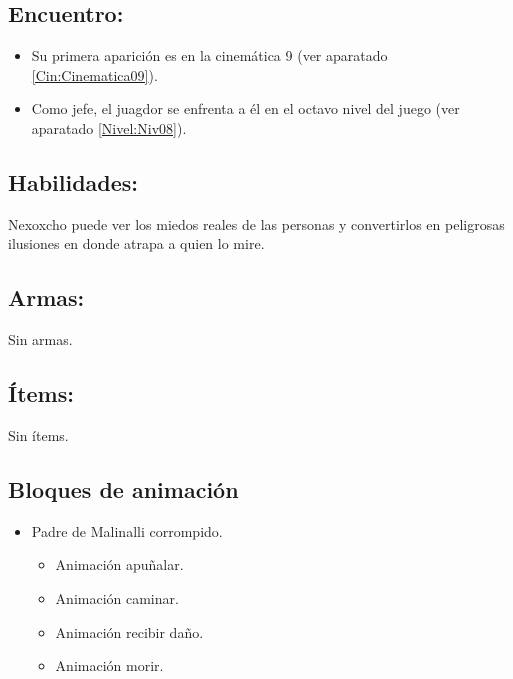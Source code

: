 \subsection{Encuentro:}
\begin{itemize}
	\item Su primera aparición es en la cinemática 9 (ver aparatado \ref{Cin:Cinematica09}).
	\item Como jefe, el juagdor se enfrenta a él en el octavo nivel del juego (ver aparatado \ref{Nivel:Niv08}).
\end{itemize}

\subsection{Habilidades:}
Nexoxcho puede ver los miedos reales de las personas y convertirlos en peligrosas ilusiones en donde atrapa a quien lo mire.  

\subsection{Armas:}
Sin armas.
\subsection{Ítems:}
Sin ítems.
\subsection{Bloques de animación}
\begin{itemize}
	\item Padre de Malinalli corrompido.
		\begin{itemize}
			\item Animación apuñalar.
			\item Animación caminar.
			\item Animación recibir daño.
			\item Animación morir.
		\end{itemize}
\end{itemize}